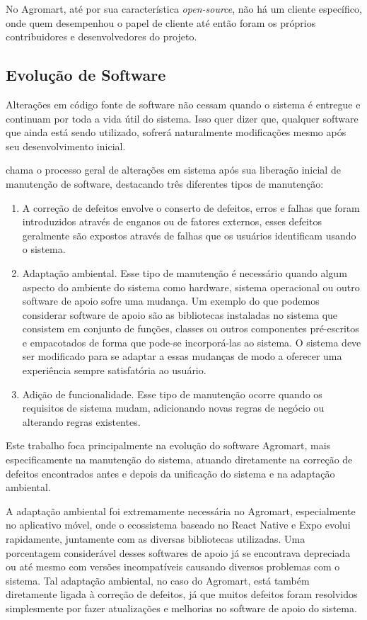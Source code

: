 No Agromart, até por sua característica \textit{open-source}, não há um cliente específico, onde quem desempenhou o papel de cliente até então foram os próprios contribuidores e desenvolvedores do projeto.

\subsection{Evolução de Software}
Alterações em código fonte de software não cessam quando o sistema é entregue e continuam por toda a vida útil do sistema. Isso quer dizer que, qualquer software que ainda está sendo utilizado, sofrerá naturalmente modificações mesmo após seu desenvolvimento inicial. 

\citeauthor{Sommerville2007} chama o processo geral de alterações em sistema após sua liberação inicial de manutenção de software, destacando três diferentes tipos de manutenção:

\begin{enumerate}
    \item A correção de defeitos envolve o conserto de defeitos, erros e falhas que foram introduzidos através de enganos ou de fatores externos, esses defeitos geralmente são expostos através de falhas que os usuários identificam usando o sistema.
    \item Adaptação ambiental. Esse tipo de manutenção é necessário quando algum aspecto do ambiente do sistema como hardware, sistema operacional ou outro software de apoio sofre uma mudança. Um exemplo do que podemos considerar software de apoio são as bibliotecas instaladas no sistema que consistem em conjunto de funções, classes ou outros componentes pré-escritos e empacotados de forma que pode-se incorporá-las ao sistema. O sistema deve ser modificado para se adaptar a essas mudanças de modo a oferecer uma experiência sempre satisfatória ao usuário.
    \item Adição de funcionalidade. Esse tipo de manutenção ocorre quando os requisitos de sistema mudam, adicionando novas regras de negócio ou alterando regras existentes.
\end{enumerate}

Este trabalho foca principalmente na evolução do software Agromart, mais especificamente na manutenção do sistema, atuando diretamente na correção de defeitos encontrados antes e depois da unificação do sistema e na adaptação ambiental.

A adaptação ambiental foi extremamente necessária no Agromart, especialmente no aplicativo móvel, onde o ecossistema baseado no React Native e Expo evolui rapidamente, juntamente com as diversas bibliotecas utilizadas. Uma porcentagem considerável desses softwares de apoio já se encontrava depreciada ou até mesmo com versões incompatíveis causando diversos problemas com o sistema. Tal adaptação ambiental, no caso do Agromart, está também diretamente ligada à correção de defeitos, já que muitos defeitos foram resolvidos simplesmente por fazer atualizações e melhorias no software de apoio do sistema.

